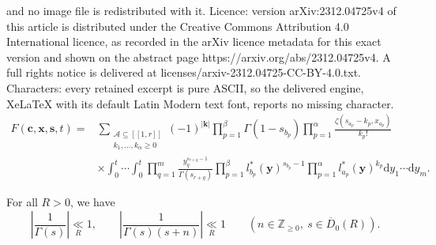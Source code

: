\documentclass[10pt,a4paper]{amsart}
\newcommand{\dd}{\mathrm{d}}
\begin{document}
and no image file is redistributed with it. Licence: version arXiv:2312.04725v4 of this article is distributed under the Creative Commons Attribution 4.0 International licence, as recorded in the arXiv licence metadata for this exact version and shown on the abstract page https://arxiv.org/abs/2312.04725v4. A full rights notice is delivered at licenses/arxiv-2312.04725-CC-BY-4.0.txt. Characters: every retained excerpt is pure ASCII, so the delivered engine, XeLaTeX with its default Latin Modern text font, reports no missing character.
\begin{align}
    F(\mathbf{c},\mathbf{x},\mathbf{s},t) =& \sum_{\substack{\mathcal{A} \subseteq [\![1,r]\!] \\ k_1,\ldots,k_{\alpha}\geq 0}} (-1)^{|\mathbf{k}|} \prod_{p=1}^{\beta} \Gamma(1-s_{b_p}) \prod_{p=1}^{\alpha} \frac{\zeta(s_{a_p}-k_p,x_{a_p})}{k_p!} \label{eq:analytic_continuation_F} \\
    & \times \int_0^t \cdots \int_0^t \prod_{q=1}^{m} \frac{y_q^{s_{r+q}-1}}{\Gamma(s_{r+q})}\prod_{p=1}^{\beta} l^*_{b_p}(\mathbf{y})^{s_{b_p}-1} \prod_{p=1}^{\alpha} l^*_{a_p}(\mathbf{y})^{k_p} \dd y_1 \cdots \dd y_{m}. \nonumber
\end{align}

\begin{lemma}
\label{lem:bound_1_over_gamma}
For all $R>0$, we have
$$ \left| \frac{1}{\Gamma(s)} \right| \underset{R}{\ll} 1, \qquad \left| \frac{1}{\Gamma(s)(s+n)} \right| \underset{R}{\ll} 1 \qquad (n \in \mathbb{Z}_{\geq 0}, \ s \in \overline{D}_0(R)). $$
\end{lemma}
\end{document}

